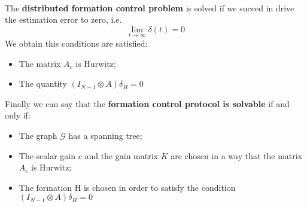 \hspace*{-5mm}
\\

\noindent
The \textbf{distributed formation control problem} is solved if we succed in drive the estimation error to zero, i.e. 
\begin{equation*}
    \lim_{t\to\infty} \delta(t)=0
\end{equation*}
We obtain this conditions are satisfied: 
\begin{itemize}
    \item The matrix $A_c$ is Hurwitz;
    \item The quantity $(I_{N-1} \otimes A)\delta_H=0$
\end{itemize}
\noindent
Finally we can say that the \textbf{formation control protocol is solvable} if and only if: 
\begin{itemize}
    \itemsep0em
    \item The graph $\mathcal{G}$ has a spanning tree;
    \item The scalar gain $c$ and the gain matrix $K$ are chosen in a way that the matrix $A_c$ is Hurwitz; 
    \item The formation H is chosen in order to satisfy the condition $(I_{N-1} \otimes A)\delta_H=0$
\end{itemize}

